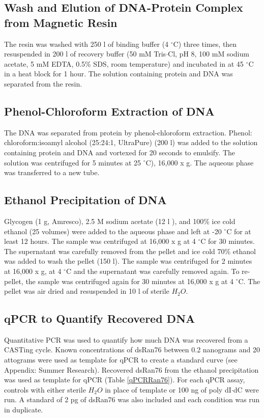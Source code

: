 \documentclass[12pt,twoside]{reedthesis}
\begin{document}
\subsection{Wash and Elution of DNA-Protein Complex from Magnetic Resin}

The resin was washed with 250 \micro l of binding buffer (4 $^{\circ}$C) three times, then resuspended in 200 \micro l of recovery buffer (50 mM Tris$\cdot$Cl, pH 8, 100 mM sodium acetate, 5 mM EDTA, 0.5\% SDS, room temperature) and incubated in at 45 $^{\circ}$C in a heat block for 1 hour. The solution containing protein and DNA was separated from the resin. 

\subsection{Phenol-Chloroform Extraction of DNA}
The DNA was separated from protein by phenol-chloroform extraction. Phenol: chloroform:isoamyl alcohol (25:24:1, UltraPure) (200 \micro l) was added to the solution containing protein and DNA and vortexed for 20 seconds to emulsify. The solution was centrifuged for 5 minutes at 25 $^{\circ}$C), 16,000 x g. The aqueous phase was transferred to a new tube. 
\subsection{Ethanol Precipitation of DNA}

 Glycogen (1 \micro g, Amresco), 2.5 M sodium acetate (12 \micro l ), and 100\% ice cold ethanol (25 volumes) were added to the aqueous phase and left at -20 $^{\circ}$C for at least 12 hours. The sample was centrifuged at 16,000 x g at 4 $^{\circ}$C for 30 minutes. The supernatant was carefully removed from the pellet and ice cold 70\% ethanol was added to wash the pellet (150 \micro l). The sample was centrifuged for 2 minutes at 16,000 x g, at 4 $^{\circ}$C and the supernatant was carefully removed again. To re-pellet, the sample was centrifuged again for 30 minutes at 16,000 x g at 4 $^{\circ}$C. The pellet was air dried and resuspended in 10 \micro l of sterile $H_{2}O$. 

\subsection{qPCR to Quantify Recovered DNA}
Quantitative PCR was used to quantify how much DNA was recovered from a CASTing cycle. Known concentrations of dsRan76 between 0.2 nanograms and 20 attograms were used as template for qPCR to create a standard curve (see Appendix: Summer Research).  Recovered dsRan76 from the ethanol precipitation was used as template for qPCR (Table \ref{qPCRRan76}). For each qPCR assay, controls with either sterile $H_{2}O$ in place of template or 100 ng of poly dI$\cdot$dC were run. A standard of 2 pg of dsRan76 was also included and each condition was run in duplicate.
\end{document}
